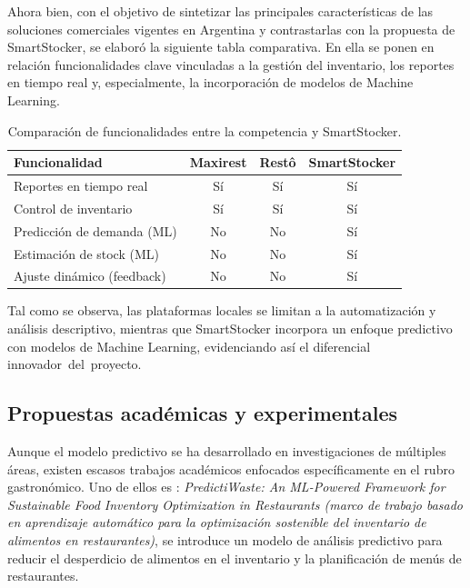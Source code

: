 Ahora bien, con el objetivo de sintetizar las principales características de las soluciones comerciales vigentes en Argentina y contrastarlas con la propuesta de SmartStocker, se elaboró la siguiente tabla comparativa. En ella se ponen en relación funcionalidades clave vinculadas a la gestión del inventario, los reportes en tiempo real y, especialmente, la incorporación de modelos de Machine Learning.  
\begin{table}[htbp]
    \centering
    \begin{tabular}{lccc}
        \hline
        \textbf{Funcionalidad} & \textbf{Maxirest} & \textbf{Restô} & \textbf{SmartStocker} \\
        \hline
        Reportes en tiempo real    & Sí & Sí & Sí \\
        Control de inventario      & Sí & Sí & Sí \\
        Predicción de demanda (ML) & No & No & Sí \\
        Estimación de stock (ML)   & No & No & Sí \\
        Ajuste dinámico (feedback) & No & No & Sí \\
        \hline
    \end{tabular}
    \caption{Comparación de funcionalidades entre la competencia y SmartStocker.}
    \label{tab:comparacion-funcionalidades}
\end{table}
Tal como se observa, las plataformas locales se limitan a la automatización y análisis descriptivo, mientras que SmartStocker incorpora un enfoque predictivo con modelos de Machine Learning, evidenciando así el diferencial innovador del proyecto.

\subsection{Propuestas académicas y experimentales}\label{sec:academico}

Aunque el modelo predictivo se ha desarrollado en investigaciones de múltiples áreas, existen escasos trabajos académicos enfocados específicamente en el rubro gastronómico. Uno de ellos es \parencite{hari2024predictiwaste}: \emph{PredictiWaste: An ML-Powered Framework for Sustainable Food Inventory Optimization in Restaurants (marco de trabajo basado en aprendizaje automático para la optimización sostenible del inventario de alimentos en restaurantes)}, se introduce un modelo de análisis predictivo para reducir el desperdicio de alimentos en el inventario y la planificación de menús de restaurantes. 

